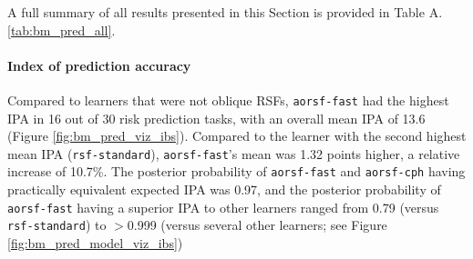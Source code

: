 \documentclass[twoside,11pt]{article}\usepackage[]{graphicx}\usepackage[]{xcolor}
\newcommand{\tabrefAppendix}[1]{Table A.\ref{#1}}
\begin{document}
A full summary of all results presented in this Section is provided in \tabrefAppendix{tab:bm_pred_all}.

\paragraph{Index of prediction accuracy}

Compared to learners that were not oblique RSFs, \texttt{aorsf-fast} had the highest IPA in 16 out of 30 risk prediction tasks, with an overall mean IPA of 13.6 (Figure \ref{fig:bm_pred_viz_ibs}). Compared to the learner with the second highest mean IPA (\texttt{rsf-standard}), \texttt{aorsf-fast}'s mean was 1.32 points higher, a relative increase of 10.7\%. The posterior probability of \texttt{aorsf-fast} and \texttt{aorsf-cph} having practically equivalent expected IPA was 0.97, and the posterior probability of \texttt{aorsf-fast} having a superior IPA to other learners ranged from 0.79 (versus \texttt{rsf-standard}) to $>$0.999 (versus several other learners; see Figure \ref{fig:bm_pred_model_viz_ibs})
\end{document}
